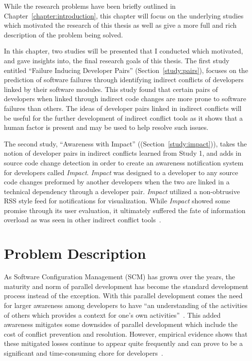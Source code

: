 \label{chapter:problem}

\newlength{\savedunitlength}
\setlength{\unitlength}{2em}

While the research problems have been briefly outlined in Chapter~\ref{chapter:introduction}, this chapter
will focus on the underlying studies which motivated the research of this thesis as well as give a more full
and rich description of the problem being solved.

In this chapter, two studies will be presented that I conducted which motivated, and gave insights into, 
the final research goals
of this thesis. The first study entitled ``Failure Inducing Developer Pairs''
(Section~\ref{study:pairs}), focuses on the prediction of
software failures through identifying indirect conflicts of developers linked by their software modules. 
This study found that certain pairs of developers when linked through indirect code changes are more prone
to software failures than others. The ideas of developer pairs linked in indirect conflicts will be
useful for the further development of indirect conflict tools as it shows that a human factor is present
and may be used to help resolve such issues.

The second study, ``Awareness with Impact'' ((Section~\ref{study:impact})), 
takes the notion of developer
pairs in indirect conflicts learned from Study 1, and adds in source code change detection in order to create
an awareness notification system for developers called \textit{Impact}. \textit{Impact} was designed to a developer
to any source code changes preformed by another developers when the two are linked in a technical dependency through
a developer pair. \textit{Impact} utilized a non-obtrusive RSS style feed for notifications for visualization. 
While \textit{Impact} showed some promise through its user evaluation, it ultimately suffered the fate of information
overload as was seen in other indirect conflict tools~\cite{Sarma:2007:TSA,Servant:2010:CPI,Trainer:2005:BGT}.




\section{Problem Description}

As Software Configuration Management (SCM) has grown over the years, the maturity and norm of parallel 
development has become the standard development process instead of the exception. With this parallel development
comes the need for larger awareness among developers to have ``an understanding of the activities of others
which provides a context for one's own activities''~\cite{Dourish:1992:ACS}. This added awareness
mitigates some downsides of parallel development which include the cost of conflict prevention and resolution. However,
empirical evidence shows that these mitigated losses continue to appear quite frequently and can prove to be a significant
and time-consuming chore for developers~\cite{Perry:2001:PCL}.

